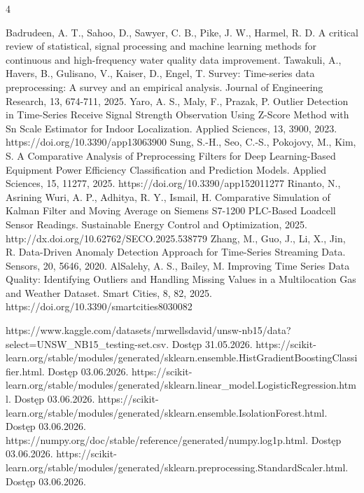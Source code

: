 \documentclass[12pt,twoside]{article}
\begin{document}
\clearpage


\begin{thebibliography}{4}

 Badrudeen, A. T., Sahoo, D., Sawyer, C. B., Pike, J. W., Harmel, R. D. A critical review of statistical, signal processing and machine learning methods for continuous and high-frequency water quality data improvement.
 Tawakuli, A., Havers, B., Gulisano, V., Kaiser, D., Engel, T. Survey: Time-series data preprocessing: A survey and an empirical analysis. Journal of Engineering Research, 13, 674-711, 2025.
 Yaro, A. S., Maly, F., Prazak, P. Outlier Detection in Time-Series Receive Signal Strength Observation Using Z-Score Method with Sn Scale Estimator for Indoor Localization. Applied Sciences, 13, 3900, 2023. https://doi.org/10.3390/app13063900
 Sung, S.-H., Seo, C.-S., Pokojovy, M., Kim, S. A Comparative Analysis of Preprocessing Filters for Deep Learning-Based Equipment Power Efficiency Classification and Prediction Models. Applied Sciences, 15, 11277, 2025. https://doi.org/10.3390/app152011277
 Rinanto, N., Asrining Wuri, A. P., Adhitya, R. Y., Ismail, H. Comparative Simulation of Kalman Filter and Moving Average on Siemens S7-1200 PLC-Based Loadcell Sensor Readings. Sustainable Energy Control and Optimization, 2025. http://dx.doi.org/10.62762/SECO.2025.538779
 Zhang, M., Guo, J., Li, X., Jin, R. Data-Driven Anomaly Detection Approach for Time-Series Streaming Data. Sensors, 20, 5646, 2020.
 AlSalehy, A. S., Bailey, M. Improving Time Series Data Quality: Identifying Outliers and Handling Missing Values in a Multilocation Gas and Weather Dataset. Smart Cities, 8, 82, 2025. https://doi.org/10.3390/smartcities8030082


 https://www.kaggle.com/datasets/mrwellsdavid/unsw-nb15/data?select=UNSW\_NB15\_testing-set.csv. Dostęp 31.05.2026.
 https://scikit-learn.org/stable/modules/generated/sklearn.ensemble.HistGradientBoostingClassifier.html. Dostęp 03.06.2026.
 https://scikit-learn.org/stable/modules/generated/sklearn.linear\_model.LogisticRegression.html. Dostęp 03.06.2026.
 https://scikit-learn.org/stable/modules/generated/sklearn.ensemble.IsolationForest.html. Dostęp 03.06.2026.
 https://numpy.org/doc/stable/reference/generated/numpy.log1p.html. Dostęp 03.06.2026.
 https://scikit-learn.org/stable/modules/generated/sklearn.preprocessing.StandardScaler.html. Dostęp 03.06.2026.


\end{thebibliography}

\clearpage

\makesummary
\end{document}

